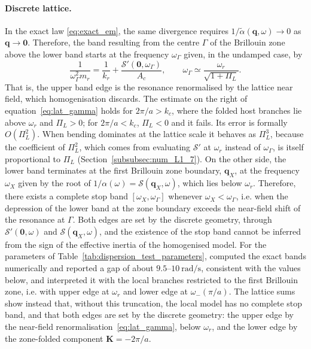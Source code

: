 \paragraph{Discrete lattice.} In the exact law \eqref{eq:exact_em}, the same divergence requires $1/\widetilde{\alpha}(\mathbf{q},\omega)\to0$ as $\mathbf{q}\to\mathbf{0}$. Therefore, the band resulting from the centre $\Gamma$ of the Brillouin zone above the lower band starts at the frequency $\omega_\Gamma$ given, in the undamped case, by
\begin{equation}\label{eq:lat_gamma}
    \frac{1}{\omega_\Gamma^2m_r}=\frac{1}{k_r}+\frac{\mathcal{S}'(\mathbf{0},\omega_\Gamma)}{A_c},
    \qquad
    \omega_\Gamma\simeq\frac{\omega_r}{\sqrt{1+\Pi_L}} .
\end{equation}
That is, the upper band edge is the resonance renormalised by the lattice near field, which homogenisation discards. {\color{red}The estimate on the right of equation~\eqref{eq:lat_gamma} holds for $2\pi/a>k_c$, where the folded host branches lie above $\omega_r$ and $\Pi_L>0$; for $2\pi/a<k_c$, $\Pi_L<0$ and it fails. Its error is formally $O(\Pi_L^2)$. When bending dominates at the lattice scale it behaves as $\Pi_L^3$, because the coefficient of $\Pi_L^2$, which comes from evaluating $\mathcal{S}'$ at $\omega_r$ instead of $\omega_\Gamma$, is itself proportional to $\Pi_L$ (Section~\ref{subsubsec:num_L1_7}).} On the other side, the lower band terminates at the first Brillouin zone boundary, $\mathbf{q}_X$, at the frequency $\omega_X$ given by the root of $1/\alpha(\omega)=\mathcal{S}(\mathbf{q}_X,\omega)$, which lies below $\omega_r$. Therefore, there exists a complete stop band $[\omega_X,\omega_\Gamma]$ whenever $\omega_X<\omega_\Gamma$, i.e. when the depression of the lower band at the zone boundary exceeds the near-field shift of the resonance at $\Gamma$. Both edges are set by the discrete geometry, through $\mathcal{S}'(\mathbf{0},\omega)$ and $\mathcal{S}(\mathbf{q}_X,\omega)$, and the existence of the stop band cannot be inferred from the sign of the effective inertia of the homogenised model. {\color{red}For the parameters of Table~\ref{tab:dispersion_test_parameters}, \cite{liu2025metaplate} computed the exact bands numerically and reported a gap of about $9.5$--$10~\si{\radian\per\second}$, consistent with the values below, and interpreted it with the local branches restricted to the first Brillouin zone, i.e. with upper edge at $\omega_r$ and lower edge at $\omega_-(\pi/a)$. The lattice sums show instead that, without this truncation, the local model has no complete stop band, and that both edges are set by the discrete geometry: the upper edge by the near-field renormalisation~\eqref{eq:lat_gamma}, below $\omega_r$, and the lower edge by the zone-folded component $\mathbf{K}=-2\pi/a$.}

